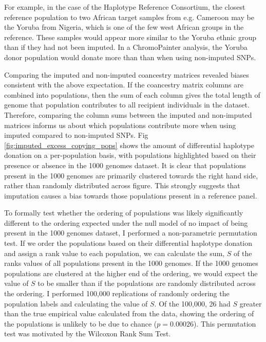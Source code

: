 For example, in the case of the Haplotype Reference Consortium, the closest reference population to two African target samples from e.g. Cameroon may be the Yoruba from Nigeria, which is one of the few west African groups in the reference. These samples would appear more similar to the Yoruba ethnic group than if they had not been imputed. In a ChromoPainter analysis, the Yoruba donor population would donate more than than when using non-imputed SNPs.    

Comparing the imputed and non-imputed coancestry matrices revealed biases consistent with the above expectation. If the coancestry matrix columns are combined into populations, then the sum of each column gives the total length of genome that population contributes to all recipient individuals in the dataset. Therefore, comparing the column sums between the imputed and non-imputed matrices informs us about which populations contribute more when using imputed compared to non-imputed SNPs. Fig \ref{fig:imputed_excess_copying_pops} shows the amount of differential haplotype donation on a per-population basis, with populations highlighted based on their presence or absence in the 1000 genomes dataset. It is clear that populations present in the 1000 genomes are primarily clustered towards the right hand side, rather than randomly distributed across figure. This strongly suggests that imputation causes a bias towards those populations present in a reference panel. 

To formally test whether the ordering of populations was likely significantly different to the ordering expected under the null model of no impact of being present in the 1000 genomes dataset, I performed a non-parametric permutation test. If we order the populations based on their differential haplotype donation and assign a rank value to each population, we can calculate the sum, $S$ of the ranks values of all populations present in the 1000 genomes. If the 1000 genomes populations are clustered at the higher end of the ordering, we would expect the value of $S$ to be smaller than if the populations are randomly distributed across the ordering. I performed 100,000 replications of randomly ordering the population labels and calculating the value of $S$. Of the 100,000, 26 had $S$ greater than the true empirical value calculated from the data, showing the ordering of the populations is unlikely to be due to chance ($p=0.00026$). This permutation test was motivated by the Wilcoxon Rank Sum Test.  

